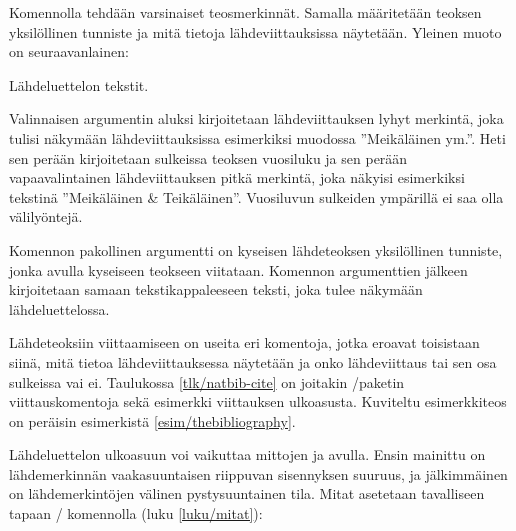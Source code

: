 Komennolla  tehdään varsinaiset teosmerkinnät. Samalla
määritetään teoksen yksilöllinen tunniste ja mitä tietoja
lähdeviittauksissa näytetään. Yleinen muoto on seuraavanlainen:

\begin{koodilohkosis}
 Lähdeluettelon tekstit.
\end{koodilohkosis}

Valinnaisen argumentin aluksi kirjoitetaan lähdeviittauksen lyhyt
merkintä, joka tulisi näkymään lähdeviittauksissa esimerkiksi muodossa
''Meikäläinen ym.''. Heti sen perään kirjoitetaan sulkeissa teoksen
vuosiluku ja sen perään vapaavalintainen lähdeviittauksen pitkä
merkintä, joka näkyisi esimerkiksi tekstinä ''Meikäläinen \&
Teikäläinen''. Vuosiluvun sulkeiden ympärillä ei saa olla välilyöntejä.

Komennon pakollinen argumentti on kyseisen lähdeteoksen yksilöllinen
tunniste, jonka avulla kyseiseen teokseen viitataan. Komennon
argumenttien jälkeen kirjoitetaan samaan tekstikappaleeseen teksti, joka
tulee näkymään lähdeluettelossa.

Lähdeteoksiin viittaamiseen on useita eri komentoja, jotka eroavat
toisistaan siinä, mitä tietoa lähdeviittauksessa näytetään ja onko
lähdeviittaus tai sen osa sulkeissa vai ei. Taulukossa
\ref{tlk/natbib-cite} on joitakin \-/paketin
viittauskomentoja sekä esimerkki viittauksen ulkoasusta. Kuviteltu
esimerkkiteos on peräisin esimerkistä \ref{esim/thebibliography}.


Lähdeluettelon ulkoasuun voi vaikuttaa mittojen  ja
 avulla. Ensin mainittu on lähdemerkinnän vaakasuuntaisen
riippuvan sisennyksen suuruus, ja jälkimmäinen on lähdemerkintöjen
välinen pystysuuntainen tila. Mitat asetetaan tavalliseen tapaan
\-/ komennolla (luku \ref{luku/mitat}):


